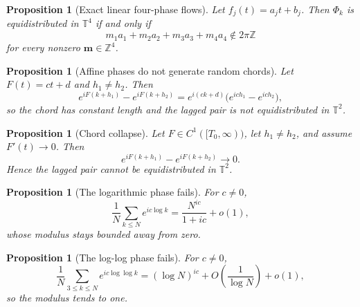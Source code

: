 \documentclass[11pt]{amsart}
\numberwithin{equation}{section}
\theoremstyle{plain}
\newtheorem{proposition}[theorem]{Proposition}
\theoremstyle{definition}
\theoremstyle{remark}
\begin{document}
\begin{proposition}[Exact linear four-phase flows]
\label{prop:linear_flows}
Let \(f_j(t)=a_jt+b_j\). Then \(\Phi_k\) is equidistributed in \(\mathbb T^4\) if and only if
\begin{equation}
m_1a_1+m_2a_2+m_3a_3+m_4a_4\notin2\pi\mathbb Z
\label{eq:linear_nonresonance}
\end{equation}
for every nonzero \(\mathbf m\in\mathbb Z^4\).
\end{proposition}

\begin{proposition}[Affine phases do not generate random chords]
\label{prop:affine_chords}
Let \(F(t)=ct+d\) and \(h_1\neq h_2\). Then
\begin{equation}
e^{iF(k+h_1)}-e^{iF(k+h_2)}
=e^{i(ck+d)}\bigl(e^{ich_1}-e^{ich_2}\bigr),
\label{eq:affine_chord}
\end{equation}
so the chord has constant length and the lagged pair is not equidistributed in \(\mathbb T^2\).
\end{proposition}

\begin{proposition}[Chord collapse]
\label{prop:chord_collapse}
Let \(F\in C^1([T_0,\infty))\), let \(h_1\neq h_2\), and assume \(F'(t)\to0\). Then
\begin{equation}
e^{iF(k+h_1)}-e^{iF(k+h_2)}\longrightarrow0.
\label{eq:chord_collapse}
\end{equation}
Hence the lagged pair cannot be equidistributed in \(\mathbb T^2\).
\end{proposition}

\begin{proposition}[The logarithmic phase fails]
\label{prop:log_phase_fails}
For \(c\neq0\),
\begin{equation}
\frac1N\sum_{k\leq N}e^{ic\log k}
=\frac{N^{ic}}{1+ic}+o(1),
\label{eq:log_phase_average}
\end{equation}
whose modulus stays bounded away from zero.
\end{proposition}

\begin{proposition}[The log-log phase fails]
\label{prop:loglog_phase_fails}
For \(c\neq0\),
\begin{equation}
\frac1N\sum_{3\leq k\leq N}e^{ic\log\log k}
=(\log N)^{ic}+O\left(\frac1{\log N}\right)+o(1),
\label{eq:loglog_phase_average}
\end{equation}
so the modulus tends to one.
\end{proposition}
\end{document}
